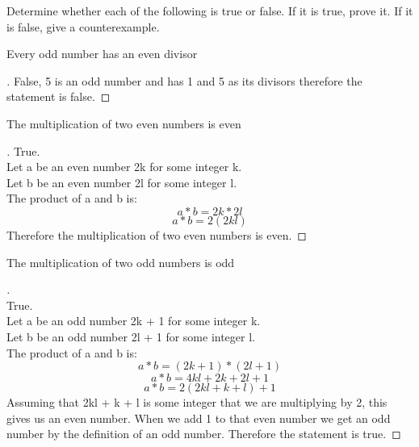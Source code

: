 \documentclass[12pt]{article}
\newenvironment{exercise}[2][Exercise]{\begin{trivlist}
\item[\hskip \labelsep {\bfseries #1}\hskip \labelsep {\bfseries #2.}]}{\end{trivlist}}
\newenvironment{solution}[1][{\color{red} Solution:}]{\begin{trivlist}
\item[\hskip \labelsep {\bfseries #1}\hskip \labelsep {\bfseries}]}{\end{trivlist}}
\begin{document}
\clearpage

\begin{exercise}{2}

Determine whether each of the following is true or false. If it is true, prove it. If it is false, give a counterexample.

\begin{enumerate}[(a)]
	\item Every odd number has an even divisor
    \begin{solution} 
        \begin{proof}[\unskip\nopunct]
            False, 5 is an odd number and has 1 and 5 as its divisors therefore the statement is false. 
        \end{proof}
    \end{solution}

    \item The multiplication of two even numbers is even
    \begin{solution} 
        \begin{proof}[\unskip\nopunct]
            True. 
            \\Let a be an even number 2k for some integer k. 
            \\Let b be an even number 2l for some integer l. 
            \\The product of a and b is:
            $$a * b = 2k * 2l$$
            $$a * b = 2 (2kl)$$
            Therefore the multiplication of two even numbers is even.
        \end{proof}
    \end{solution}    
        
	\item The multiplication of two odd numbers is odd

    \begin{solution} 
        \begin{proof}[\unskip\nopunct]
            \\True. 
            \\Let a be an odd number 2k + 1 for some integer k. 
            \\Let b be an odd number 2l + 1 for some integer l. 
            \\The product of a and b is:
            $$a * b = (2k + 1) * (2l + 1)$$
            $$a * b = 4kl + 2k + 2l + 1 $$
            $$a * b = 2(2kl + k + l) + 1 $$
            Assuming that 2kl + k + l is some integer that we are multiplying by 2, this gives us an even number. When we add 1 to that even number we get an odd number by the definition of an odd number. Therefore the statement is true. 
        \end{proof}
    \end{solution}


\end{enumerate}
\end{exercise}
\end{document}
